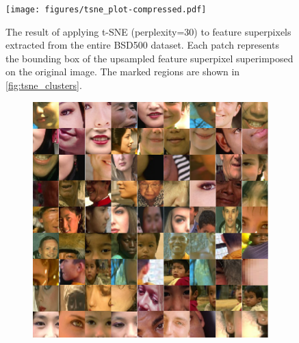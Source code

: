 \begin{figure}
    \centering
    \texttt{[image: figures/tsne\_plot-compressed.pdf]}
    \caption{The result of applying t-SNE (perplexity=30) to feature superpixels extracted from the entire BSD500 dataset. Each patch represents the bounding box of the upsampled feature superpixel superimposed on the original image. The marked regions are shown in \autoref{fig:tsne_clusters}.}
    \label{fig:tsne}
\end{figure}

\begin{figure}[!ht]
    \centering
    \begin{subfigure}[b]{.32\textwidth}
        \centering
        \includegraphics[width=\linewidth]{figures/tsne_a.pdf}
        \caption{}
    \end{subfigure}
    \begin{subfigure}[b]{.32\textwidth}
        \centering

\end{subfigure}
\end{figure}
